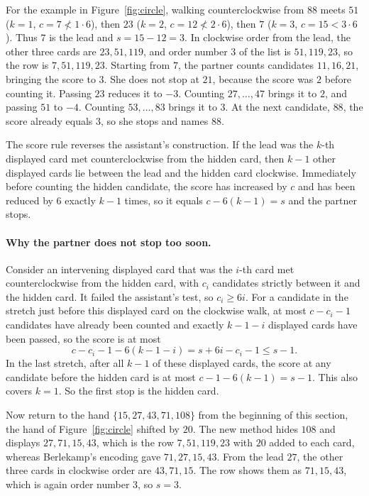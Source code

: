 \documentclass[11pt]{article}
\begin{document}
For the example in Figure~\ref{fig:circle}, walking counterclockwise
from $88$ meets $51$ ($k=1$, $c=7\not<1\cdot6$), then $23$ ($k=2$,
$c=12\not<2\cdot6$), then $7$ ($k=3$, $c=15<3\cdot6$). Thus $7$ is the lead and
$s=15-12=3$. 
In clockwise order from the lead, the other three cards are $23,51,119$, and order number $3$ of the list is $51,119,23$, so the row is $7,51,119,23$.
Starting from $7$, the partner counts candidates
$11,16,21$, bringing the score to $3$. She does not stop at $21$,
because the score was $2$ before counting it. Passing $23$ reduces it
to $-3$. Counting $27,\ldots,47$ brings it to $2$, and passing $51$ to
$-4$. Counting $53,\ldots,83$ brings it to $3$. At the next candidate,
$88$, the score already equals $3$, so she stops and names $88$. 

The score rule reverses the assistant's construction. If the lead was the $k$-th displayed card met counterclockwise from the hidden card, then $k-1$ other displayed cards lie between the lead and the hidden card clockwise. Immediately before counting the hidden candidate, the score has increased by $c$ and has been reduced by $6$ exactly $k-1$ times, so it equals $c-6(k-1)=s$ and the partner stops.

\paragraph{Why the partner does not stop too soon.}
Consider an intervening displayed card that was the $i$-th card met counterclockwise from the hidden card, with $c_i$ candidates strictly between it and the hidden card. It failed the assistant's test, so $c_i\geq6i$. For a candidate in the stretch just before this displayed card on the clockwise walk, at most $c-c_i-1$ candidates have already been counted and exactly $k-1-i$ displayed cards have been passed, so the score is at most
$$
c-c_i-1-6(k-1-i)=s+6i-c_i-1\leq s-1.
$$
In the last stretch, after all $k-1$ of these displayed cards, the score at any candidate before the hidden card is at most $c-1-6(k-1)=s-1$. This also covers $k=1$. So the first stop is the hidden card.

   
   
Now return to the hand $\{15,27,43,71,108\}$ from the beginning of this section, the hand of Figure~\ref{fig:circle} shifted by $20$. The new method hides $108$ and displays $27,71,15,43$, which is the row $7,51,119,23$ with $20$ added to each card, whereas Berlekamp's encoding gave $71,27,15,43$.
From the lead $27$, the other three cards in clockwise order are $43,71,15$. The row shows them as $71,15,43$, which is again order number $3$, so $s=3$.
\end{document}

